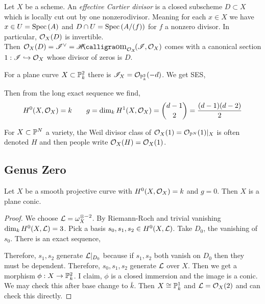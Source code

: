 \documentclass[12pt]{article}
\begin{document}
\begin{defn}
Let $X$ be a scheme. An \textit{effective Cartier divisor} is a closed subscheme $D \subset X$ which is locally cut out by one nonzerodivisor. Meaning for each $x \in X$ we have $x \in U = \Spec{A}$ and $D \cap U = \Spec{A/(f)}$ for $f$ a nonzero divisor. In particular, $\struct{X}(D)$ is invertible.
\bigskip\\
Then $\struct{X}(D) = \I^\vee = \shHom{\struct{X}}{\I}{\struct{X}}$ comes with a canonical section $1 : \I \embed \struct{X}$ whose divisor of zeros is $D$.
\end{defn}

\begin{rmk}
For a plane curve $X \subset \P^2_k$ there is $\I_X = \struct{\P^2_k}(-d)$. We get SES,
\begin{center}
\end{center}
Then from the long exact sequence we find, 
\[ H^0(X, \struct{X}) = k \quad \quad g = \dim_k H^1(X, \struct{X}) =  { d - 1 \choose 2 } = \frac{(d - 1)(d - 2)}{2} \]
\end{rmk}

\begin{rmk}
For $X \subset \P^N$ a variety, the Weil divisor class of $\struct{X}(1) = \struct{\P^N}(1)|_X$ is often denoted $H$ and then people write $\struct{X}(H) = \struct{X}(1)$. 
\end{rmk}

\subsection{Genus Zero}

\begin{prop}
Let $X$ be a smooth projective curve with $H^0(X, \struct{X}) = k$ and $g = 0$. Then $X$ is a plane conic.
\end{prop}

\begin{proof}
We choose $\L = \omega^{\otimes -2}_X$. 
By Riemann-Roch and trivial vanishing $\dim_k H^0(X, \L) = 3$. Pick a basis $s_0, s_1, s_2 \in H^0(X, \L)$. Take $D_0$, the vanishing of $s_0$. There is an exact sequence,
\begin{center}
\end{center}
Therefore, $s_1, s_2$ generate $\L |_{D_0}$ because if $s_1, s_2$ both vanish on $D_0$ then they must be dependent. Therefore, $s_0, s_1, s_2$ generate $\L$ over $X$. Then we get a morphism $\phi : X \to \P^2_k$. I claim, $\phi$ is a closed immersion and the image is a conic. 
\bigskip\\
We may check this after base change to $\bar{k}$. Then $X \cong \P^1_k$ and $\L = \struct{X}(2)$ and can check this directly. 
\end{proof}
\end{document}
